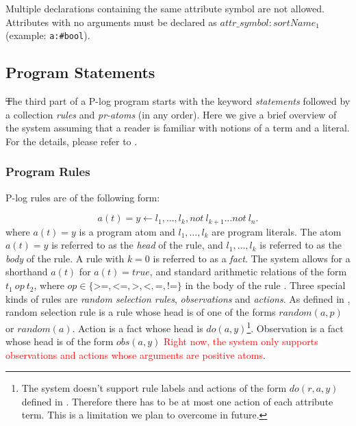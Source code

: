 \documentclass[12pt, letterpaper]{article}
\begin{document}
Multiple declarations containing the same attribute symbol are not allowed.
Attributes with no arguments must be declared as $attr\_symbol:sortName_1$ (example: \texttt{a:\#bool}).


\subsection{Program Statements}

\st The third part of a P-log program starts with the keyword \textit{statements} followed by a collection \textit{rules} and \textit{pr-atoms} (in any order). Here we give a brief overview of the system assuming that a reader is familiar with notions of a term and a literal. For the details, please refer to \cite{Balai2019}. 

\subsubsection{Program Rules}
P-log rules are of the following form:

\begin{equation}
   a(t) = y \leftarrow l_1,  \ldots, l_k, not~l_{k+1} \ldots not~l_{n}.
 \end{equation}
where $a(t) = y$ is a program atom and $l_1,\ldots,l_k$ are program literals.
The atom $a(t) = y$ is referred to as the \textit{head} of the rule, and $l_1,\ldots,l_k$ is referred to as the \textit{body} of the rule.
 A rule with $k=0$ is referred to as a \textit{fact}.
 The system allows for a shorthand $a(t)$ for $a(t) = true$, and standard arithmetic relations of the form $t_1~op~t_2$, where $op \in \{\texttt{>=},\texttt{<=},\texttt{>},\texttt{<},\texttt{=},\texttt{!=}\}$ in the body of the rule .
 Three special kinds of rules are \textit{random selection rules}, \textit{observations} and \textit{actions}.
 As defined in \cite{Balai2019},
 random selection rule is a rule whose head is of one of the forms $random(a,p)$ or $random(a)$. Action is a fact whose head is $do(a,y)$\footnote{The system doesn't support rule labels and actions of the form $do(r,a,y)$ defined in \cite{Balai2019}. Therefore there has to be at most one action of each attribute term. This is a limitation we plan to overcome in future.}.
 Observation is a fact whose head is of the form $obs(a,y)$ \textcolor{red}{Right now, the system only supports observations and actions whose arguments are positive atoms}.
\end{document}
